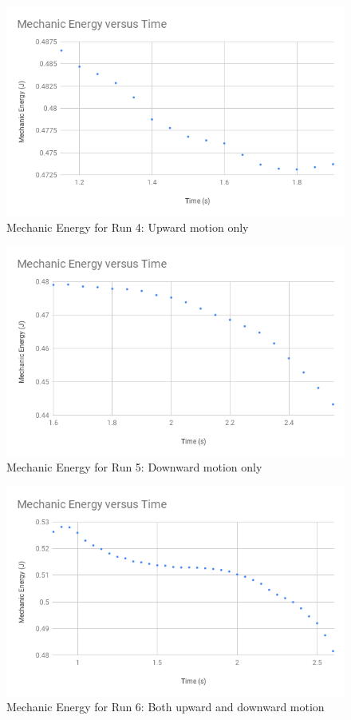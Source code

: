 %
\begin{figure}[ht]
    \centering
    \includegraphics[scale=0.71]{image/07-mechanic/energy-4.png}
    \caption{Mechanic Energy for Run 4: Upward motion only}
    \label{figure.07.run.4.e}
\end{figure}
%
\begin{figure}[ht]
    \centering
    \includegraphics[scale=0.71]{image/07-mechanic/energy-5.png}
    \caption{Mechanic Energy for Run 5: Downward motion only}
    \label{figure.07.run.5.e}
\end{figure}
%
\begin{figure}[ht]
    \centering
    \includegraphics[scale=0.71]{image/07-mechanic/energy-6.png}
    \caption{Mechanic Energy for Run 6: Both upward and downward motion}
    \label{figure.07.run.6.e}
\end{figure}
%
